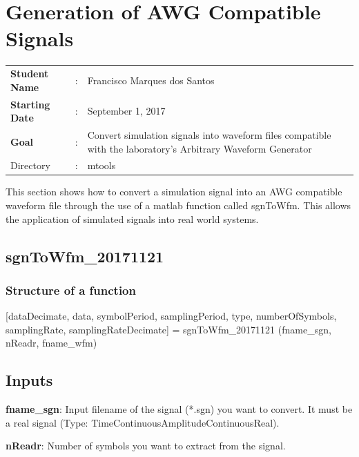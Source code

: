 \clearpage

\section{Generation of AWG Compatible Signals}

\begin{tcolorbox}	
\begin{tabular}{p{2.75cm} p{0.2cm} p{10.5cm}} 	
\textbf{Student Name}  &:& Francisco Marques dos Santos\\
\textbf{Starting Date} &:& September 1, 2017\\
\textbf{Goal}          &:& Convert simulation signals into waveform files compatible with the laboratory's Arbitrary Waveform Generator\\
Directory              &:& mtools
\end{tabular}
\end{tcolorbox}


This section shows how to convert a simulation signal into an AWG compatible waveform file through the use of a matlab function called sgnToWfm. This allows the application of simulated signals into real world systems.

\subsection{sgnToWfm\_20171121}

\subsubsection{Structure of a function}
[dataDecimate, data, symbolPeriod, samplingPeriod, type, numberOfSymbols, samplingRate, samplingRateDecimate]  =  sgnToWfm\_20171121 (fname\_sgn, nReadr, fname\_wfm)   


\subsection*{Inputs}

\indent

\textbf{fname\_sgn}: Input filename of the signal (*.sgn) you want to convert. It must be a real signal (Type: TimeContinuousAmplitudeContinuousReal).
\bigskip

\textbf{nReadr}: Number of symbols you want to extract from the signal.
\bigskip

